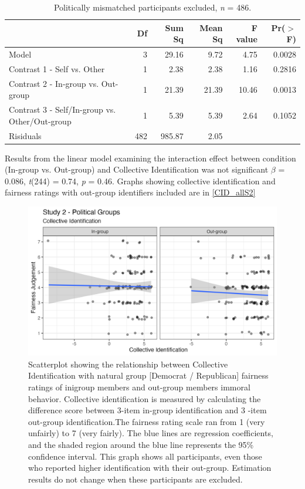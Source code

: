 \documentclass[12pt,]{article}
\begin{document}
\begin{table}[ht]
\centering
\begin{tabular}{lrrrrr}
  \hline
 & Df & Sum Sq & Mean Sq & F value & Pr($>$F) \\ 
  \hline
Model & 3 & 29.16 & 9.72 & 4.75 & 0.0028 \\ 
  Contrast 1 - Self vs. Other & 1 & 2.38 & 2.38 & 1.16 & 0.2816 \\ 
  Contrast 2 - In-group vs. Out-group & 1 & 21.39 & 21.39 & 10.46 & 0.0013 \\ 
  Contrast 3 - Self/In-group vs. Other/Out-group & 1 & 5.39 & 5.39 & 2.64 & 0.1052 \\ 
  Risiduals & 482 & 985.87 & 2.05 &  &  \\ 
   \hline
\end{tabular}
\caption{Politically mismatched participants excluded, \emph{n} = 486.} 
\label{mismatch}
\end{table}

\clearpage

Results from the linear model examining the interaction effect between condition (In-group vs. Out-group) and Collective Identification was not significant $\beta$ = 0.086, \emph{t}(244) = 0.74, \emph{p} = 0.46. Graphs showing collective identification and fairness ratings with out-group identifiers included are in \cref{CID_allS2}

\vspace{0.5cm}

\begin{figure}
	\centering
	\includegraphics{Plots/Study2_CI_all.png}
	\caption{Scatterplot showing the relationship between Collective Identification with natural group [Democrat / Republican] fairness ratings of inigroup members and out-group members immoral behavior. Collective identification is measured by calculating the difference score between 3-item in-group identification and 3 -item out-group identification.The fairness rating scale ran from 1 (very unfairly) to 7 (very fairly). The blue lines are regression coefficients, and the shaded region around the blue line represents the 95\% confidence interval. This graph shows all participants, even those who reported higher identification with their out-group. Estimation results do not change when these participants are excluded. }
	\label{fig:CID_allS2}
\end{figure}
\end{document}
